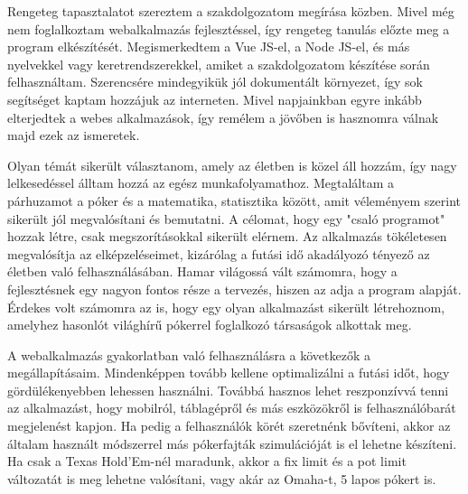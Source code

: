 Rengeteg tapasztalatot szereztem a szakdolgozatom megírása közben. Mivel még nem foglalkoztam webalkalmazás fejlesztéssel, így rengeteg tanulás előzte meg a program elkészítését. Megismerkedtem a Vue JS-el, a Node JS-el, és más nyelvekkel vagy keretrendszerekkel, amiket a szakdolgozatom készítése során felhasználtam. Szerencsére mindegyikük jól dokumentált környezet, így sok segítséget kaptam hozzájuk az interneten. Mivel napjainkban egyre inkább elterjedtek a webes alkalmazások, így remélem a jövőben is hasznomra válnak majd ezek az ismeretek.

Olyan témát sikerült választanom, amely az életben is közel áll hozzám, így nagy lelkesedéssel álltam hozzá az egész munkafolyamathoz. Megtaláltam a párhuzamot a póker és a matematika, statisztika között, amit véleményem szerint sikerült jól megvalósítani és bemutatni. A célomat, hogy egy "csaló programot" hozzak létre, csak megszorításokkal sikerült elérnem. Az alkalmazás tökéletesen megvalósítja az elképzeléseimet, kizárólag a futási idő akadályozó tényező az életben való felhasználásában. Hamar világossá vált számomra, hogy a fejlesztésnek egy nagyon fontos része a tervezés, hiszen az adja a program alapját. Érdekes volt számomra az is, hogy egy olyan alkalmazást sikerült létrehoznom, amelyhez hasonlót világhírű pókerrel foglalkozó társaságok alkottak meg.

A webalkalmazás gyakorlatban való felhasználásra a következők a megállapításaim. Mindenképpen tovább kellene optimalizálni a futási időt, hogy gördülékenyebben lehessen használni. Továbbá hasznos lehet reszponzívvá tenni az alkalmazást, hogy mobilról, táblagépről és más eszközökről is felhasználóbarát megjelenést kapjon. Ha pedig a felhasználók körét szeretnénk bővíteni, akkor az általam használt módszerrel más pókerfajták szimulációját is el lehetne készíteni. Ha csak a Texas Hold'Em-nél maradunk, akkor a fix limit és a pot limit változatát is meg lehetne valósítani, vagy akár az Omaha-t, 5 lapos pókert is.